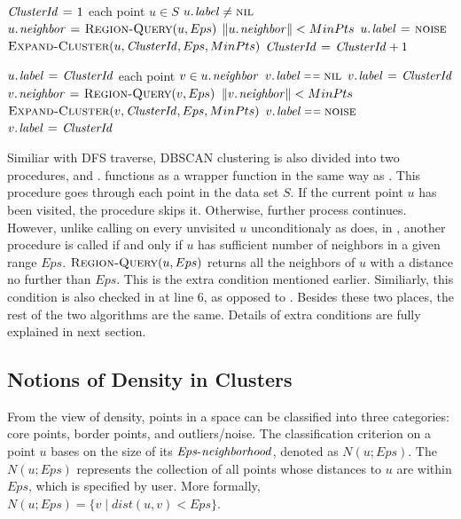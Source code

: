 \begin{codebox}
\li	$\id{ClusterId} \gets 1$
\li	\For each point $u \in S$
\li	\Do
		\If $\attrib{u}{label} \neq \const{nil}$
\li		\Then	
		\End		
\li			$\attrib{u}{neighbor} \gets \proc{Region-Query}(u, Eps)$
\li			\If	$\| \attrib{u}{neighbor} \| < MinPts $
\li				\Then
					$\attrib{u}{label} \gets \const{noise}$
\li			\Else
\li				$\proc{Expand-Cluster}(u, \id{ClusterId}, Eps, MinPts)$
\li				$\id{ClusterId} \gets \id{ClusterId} + 1$
			\End
	\End
\end{codebox}

\begin{codebox}
\li	$\attrib{u}{label} \gets \id{ClusterId}$
\li	\For each point $v \in \attrib{u}{neighbor}$
\li	\Do
		\If $\attrib{v}{label} \isequal \const{nil}$
\li		\Then
			$\attrib{v}{label} \gets \id{ClusterId}$
\li			$\attrib{v}{neighbor} \gets \proc{Region-Query}(v, Eps)$
\li				\If	$\| \attrib{v}{neighbor} \| < MinPts $
\li				\Then
					$\proc{Expand-Cluster}(v, \id{ClusterId}, Eps, MinPts)$
				\End
\li		\ElseIf $\attrib{v}{label} \isequal \const{noise}$
\li		\Then
			$\attrib{v}{label} \gets \id{ClusterId}$
		\End
	\End
\end{codebox}

Similiar with DFS traverse, DBSCAN clustering is also divided into two procedures,  and .  functions as a wrapper function in the same way as . This procedure goes through each point in the data set $S$. If the current point $u$ has been visited, the procedure skips it. Otherwise, further process continues. However, unlike calling  on every unvisited $u$ unconditionaly as  does, in , another procedure  is called if and only if $u$ has sufficient number of neighbors in a given range $Eps$. $\textnormal{\scshape Region-Query}(u, Eps)$ returns all the neighbors of $u$ with a distance no further than $Eps$. This is the extra condition mentioned earlier. Similiarly, this condition is also checked in  at line 6, as opposed to . Besides these two places, the rest of the two algorithms are the same. Details of extra conditions are fully explained in next section. 

\subsection{Notions of Density in Clusters}
\label{subsec:DBSCANnotion}
From the view of density, points in a space can be classified into three categories: core points, border points, and outliers/noise. The classification criterion on a point $u$ bases on the size of its $\id{Eps-neighborhood}$, denoted as $N(u;Eps)$. The $N(u;Eps)$ represents the collection of all points whose distances to $u$ are within $Eps$, which is specified by user. More formally, $N(u;Eps) = \{v\mid dist(u, v) < Eps\}$. 

